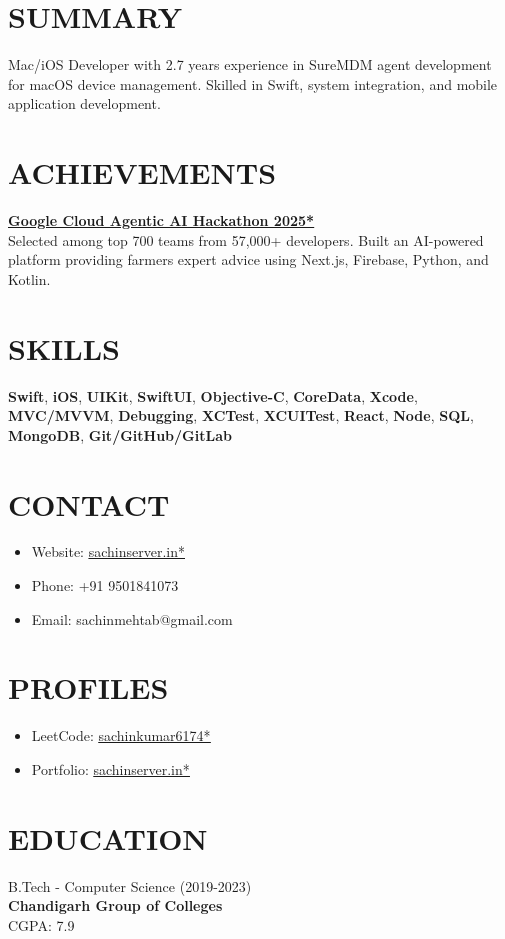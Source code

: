 \documentclass[11pt,a4paper]{moderncv}
\let\oldhref\href
\renewcommand{\href}[2]{\oldhref{#1}{\underline{#2}}}
\begin{document}
\hfill
\begin{minipage}[t]{0.35\textwidth}
\section{SUMMARY}
Mac/iOS Developer with 2.7 years experience in SureMDM agent development for macOS device management. Skilled in Swift, system integration, and mobile application development.

\section{ACHIEVEMENTS}
\textbf{\href{https://github.com/abhikumar002/Agentic-Gig-Project}{Google Cloud Agentic AI Hackathon 2025*}} \\
Selected among top 700 teams from 57,000+ developers. Built an AI-powered platform providing farmers expert advice using Next.js, Firebase, Python, and Kotlin.

\section{SKILLS}
\textbf{Swift}, \textbf{iOS}, \textbf{UIKit}, \textbf{SwiftUI}, \textbf{Objective-C}, \textbf{CoreData}, \textbf{Xcode}, \textbf{MVC/MVVM}, \textbf{Debugging}, \textbf{XCTest}, \textbf{XCUITest}, \textbf{React}, \textbf{Node}, \textbf{SQL}, \textbf{MongoDB}, \textbf{Git/GitHub/GitLab}

\section{CONTACT}
\begin{itemize}
    \item Website: \href{https://www.sachinserver.in}{sachinserver.in*}
    \item Phone: +91 9501841073
    \item Email: sachinmehtab@gmail.com
\end{itemize}

\section{PROFILES}
\begin{itemize}
    \item LeetCode: \href{https://leetcode.com/u/sachinkumar6174/}{sachinkumar6174*}
    \item Portfolio: \href{https://sachinserver.in/}{sachinserver.in*}
\end{itemize}

\section{EDUCATION}
B.Tech - Computer Science (2019-2023) \\
\textbf{Chandigarh Group of Colleges} \\
\faCalendar\enspace CGPA: 7.9
\end{minipage}
\end{document}
